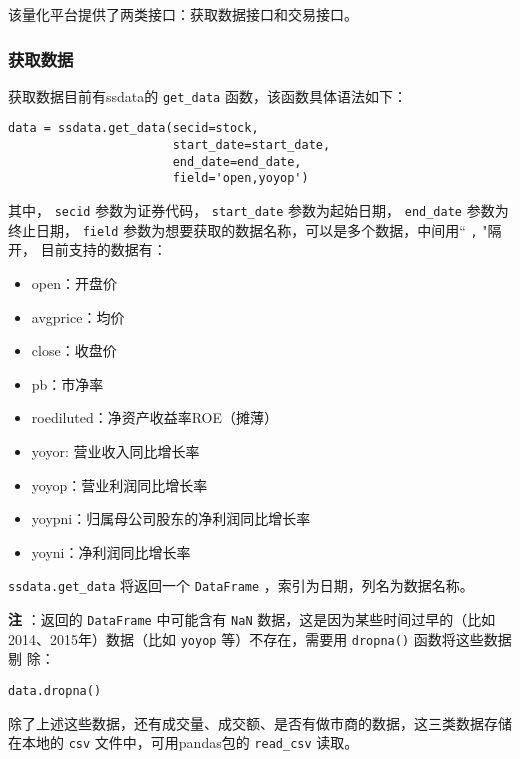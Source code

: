\documentclass[11pt]{ctexart}
\begin{document}
该量化平台提供了两类接口：获取数据接口和交易接口。

\subsubsection{获取数据}
\label{sec:org7b5301f}

获取数据目前有ssdata的 \texttt{get\_data} 函数，该函数具体语法如下：

\lstset{language=Python,label= ,caption= ,captionpos=b,numbers=none}
\begin{lstlisting}
data = ssdata.get_data(secid=stock,
                       start_date=start_date,
                       end_date=end_date,
                       field='open,yoyop')
\end{lstlisting}

其中， \texttt{secid} 参数为证券代码， \texttt{start\_date} 参数为起始日期， \texttt{end\_date} 参数为
终止日期， \texttt{field} 参数为想要获取的数据名称，可以是多个数据，中间用`` \texttt{,} "隔开，
目前支持的数据有：
\begin{itemize}
\item open：开盘价
\item avgprice：均价
\item close：收盘价
\item pb：市净率
\item roediluted：净资产收益率ROE（摊薄）
\item yoyor: 营业收入同比增长率
\item yoyop：营业利润同比增长率
\item yoypni：归属母公司股东的净利润同比增长率
\item yoyni：净利润同比增长率
\end{itemize}

\texttt{ssdata.get\_data} 将返回一个 \texttt{DataFrame} ，索引为日期，列名为数据名称。

\textbf{注} ：返回的 \texttt{DataFrame} 中可能含有 \texttt{NaN} 数据，这是因为某些时间过早的（比如
2014、2015年）数据（比如 \texttt{yoyop} 等）不存在，需要用 \texttt{dropna()} 函数将这些数据剔
除：

\lstset{language=Python,label= ,caption= ,captionpos=b,numbers=none}
\begin{lstlisting}
data.dropna()
\end{lstlisting}

除了上述这些数据，还有成交量、成交额、是否有做市商的数据，这三类数据存储在本地的
\texttt{csv} 文件中，可用pandas包的 \texttt{read\_csv} 读取。
\end{document}

